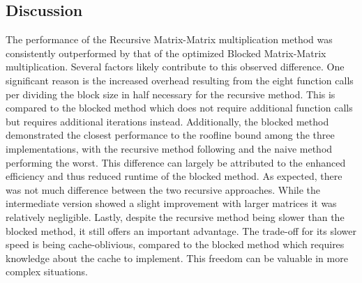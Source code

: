 \documentclass{article}
\begin{document}
\subsection{Discussion}
The performance of the Recursive Matrix-Matrix multiplication method was consistently outperformed by that of the optimized Blocked Matrix-Matrix multiplication. Several factors likely contribute to this observed difference. One significant reason is the increased overhead resulting from the eight function calls per dividing the block size in half necessary for the recursive method. This is compared to the blocked method which does not require additional function calls but requires additional iterations instead. Additionally, the blocked method demonstrated the closest performance to the roofline bound among the three implementations, with the recursive method following and the naive method performing the worst. This difference can largely be attributed to the enhanced efficiency and thus reduced runtime of the blocked method. As expected, there was not much difference between the two recursive approaches. While the intermediate version showed a slight improvement with larger matrices it was relatively negligible. Lastly, despite the recursive method being slower than the blocked method, it still offers an important advantage. The trade-off for its slower speed is being cache-oblivious, compared to the blocked method which requires knowledge about the cache to implement. This freedom can be valuable in more complex situations.
\end{document}
